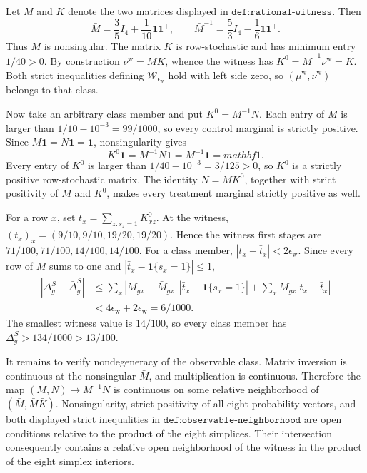 Let \(\bar M\) and \(\bar K\) denote the two matrices displayed in \(\texttt{def:rational-witness}\).  Then
\[
 \bar M=\frac35 I_4+\frac1{10}\mathbf 1\mathbf 1^{\top},
 \qquad
 \bar M^{-1}=\frac53 I_4-\frac16\mathbf 1\mathbf 1^{\top}.
\]
Thus \(\bar M\) is nonsingular.  The matrix \(\bar K\) is row-stochastic and has minimum entry \(1/40>0\).  By construction \(\nu^{\mathrm w}=\bar M\bar K\), whence the witness has \(K^0=\bar M^{-1}\nu^{\mathrm w}=\bar K\).  Both strict inequalities defining \(\mathcal W_{\epsilon_{\mathrm w}}\) hold with left side zero, so \((\mu^{\mathrm w},\nu^{\mathrm w})\) belongs to that class.

Now take an arbitrary class member and put \(K^0=M^{-1}N\).  Each entry of \(M\) is larger than \(1/10-10^{-3}=99/1000\), so every control marginal is strictly positive.  Since \(M\mathbf 1=N\mathbf 1=\mathbf 1\), nonsingularity gives
\[
 K^0\mathbf 1=M^{-1}N\mathbf 1=M^{-1}\mathbf 1=mathbf 1.
\]
Every entry of \(K^0\) is larger than \(1/40-10^{-3}=3/125>0\), so \(K^0\) is a strictly positive row-stochastic matrix.  The identity \(N=MK^0\), together with strict positivity of \(M\) and \(K^0\), makes every treatment marginal strictly positive as well.

For a row \(x\), set \(t_x=\sum_{z:s_z=1}K^0_{xz}\).  At the witness, \((t_x)_x=(9/10,9/10,19/20,19/20)\).  Hence the witness first stages are \(71/100,71/100,14/100,14/100\).  For a class member, \(|t_x-\bar t_x|<2\epsilon_{\mathrm w}\).  Since every row of \(M\) sums to one and \(|\bar t_x-\mathbf 1\{s_x=1\}|\le1\),
\[
\begin{aligned}
 |\Delta_g^S-\bar\Delta_g^S|
 &\le \sum_x|M_{gx}-\bar M_{gx}|\,
   |\bar t_x-\mathbf 1\{s_x=1\}|
   +\sum_xM_{gx}|t_x-\bar t_x|\\
 &<4\epsilon_{\mathrm w}+2\epsilon_{\mathrm w}=6/1000.
\end{aligned}
\]
The smallest witness value is \(14/100\), so every class member has \(\Delta_g^S>134/1000>13/100\).

It remains to verify nondegeneracy of the observable class.  Matrix inversion is continuous at the nonsingular \(\bar M\), and multiplication is continuous.  Therefore the map \((M,N)\mapsto M^{-1}N\) is continuous on some relative neighborhood of \((\bar M,\bar M\bar K)\).  Nonsingularity, strict positivity of all eight probability vectors, and both displayed strict inequalities in \(\texttt{def:observable-neighborhood}\) are open conditions relative to the product of the eight simplices.  Their intersection consequently contains a relative open neighborhood of the witness in the product of the eight simplex interiors.